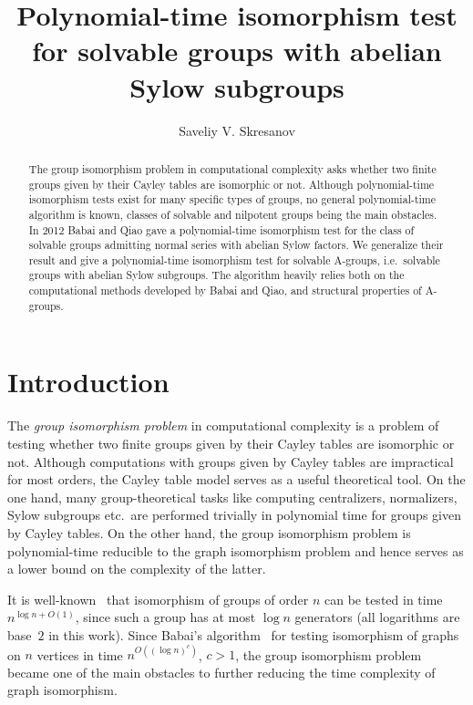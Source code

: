 \documentclass{article}
\title{Polynomial-time isomorphism test for solvable groups with abelian Sylow subgroups}
\author{Saveliy V. Skresanov}
\date{}
\begin{document}
\maketitle

\begin{abstract}
	The group isomorphism problem in computational complexity asks whether two finite groups given
	by their Cayley tables are isomorphic or not. Although polynomial-time isomorphism tests exist
	for many specific types of groups, no general polynomial-time algorithm is known,
	classes of solvable and nilpotent groups being the main obstacles.
	In 2012 Babai and Qiao gave a polynomial-time isomorphism test for the class of solvable groups
	admitting normal series with abelian Sylow factors. We generalize their result and give a polynomial-time isomorphism
	test for solvable A-groups, i.e.\ solvable groups with abelian Sylow subgroups.
	The algorithm heavily relies both on the computational methods developed by Babai and Qiao, and structural properties of A-groups.
\end{abstract}

\section{Introduction}

The \emph{group isomorphism problem} in computational complexity is a problem of testing whether two finite groups given by their Cayley tables
are isomorphic or not. Although computations with groups given by Cayley tables are impractical for most orders, the Cayley table model
serves as a useful theoretical tool. On the one hand, many group-theoretical tasks like computing centralizers, normalizers, Sylow subgroups etc.\ are performed
trivially in polynomial time for groups given by Cayley tables. On the other hand, the group isomorphism problem is polynomial-time reducible
to the graph isomorphism problem and hence serves as a lower bound on the complexity of the latter.

It is well-known~\cite{miller} that isomorphism of groups of order \( n \) can be tested in time \( n^{\log n + O(1)} \),
since such a group has at most \( \log n \) generators (all logarithms are base~\( 2 \) in this work).
Since Babai's algorithm~\cite{babai} for testing isomorphism of graphs on \( n \) vertices in time \( n^{O((\log n)^c)} \), \( c > 1 \),
the group isomorphism problem became one of the main obstacles to further reducing the time complexity of graph isomorphism.
\end{document}
